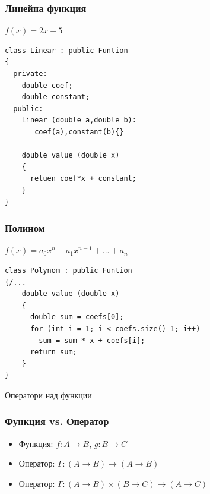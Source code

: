 \documentclass{beamer}
\begin{document}
\begin{frame}[fragile]
\frametitle{Линейна функция}

\begin{center}

$f(x) = 2x + 5$

\begin{lstlisting}
class Linear : public Funtion
{
  private:
    double coef;
    double constant;
  public:
    Linear (double a,double b):
       coef(a),constant(b){}

    double value (double x)
    {
      retuen coef*x + constant;
    }
}
\end{lstlisting}

\end{center}


\end{frame}



\begin{frame}[fragile]
\frametitle{Полином}

\begin{center}

$f(x) = a_0x^n + a_1x^{n-1}+...+a_n$

\begin{lstlisting}
class Polynom : public Funtion
{/...
    double value (double x)
    {
      double sum = coefs[0];
      for (int i = 1; i < coefs.size()-1; i++)
        sum = sum * x + coefs[i];
      return sum;
    }
}
\end{lstlisting}

\end{center}


\end{frame}




\begin{frame}
\centerline{Оператори над функции}
\end{frame}


\begin{frame}[fragile]
\frametitle{Функция vs. Оператор}

\begin{itemize}
  \item Функция: $f:A\rightarrow B$, $g:B\rightarrow C$
  \item Оператор: $\Gamma:(A\rightarrow B)\rightarrow (A\rightarrow B)$
  \item Оператор: $\Gamma:(A\rightarrow B)\times(B\rightarrow C)\rightarrow (A\rightarrow C)$
\end{itemize}

\end{frame}
\end{document}
